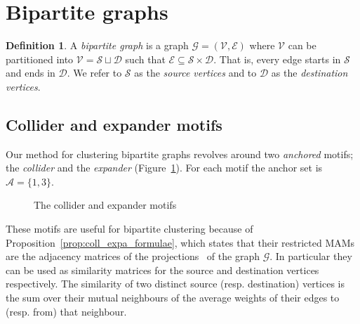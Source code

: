\documentclass[12pt,draft]{ociamthesis}
\theoremstyle{plain}
\theoremstyle{definition}
\newtheorem{definition}{Definition}[chapter]
\theoremstyle{remark}
\newcommand\ca[1]{\mathcal{#1}}
\begin{document}
\section{Bipartite graphs} \label{sec:bipartite_graphs}

\begin{definition}
A \emph{bipartite graph} is a graph $\ca{G}=(\ca{V,E})$ where $\ca{V}$ can be
partitioned into $\ca{V} = \ca{S} \sqcup \ca{D}$ such that $\ca{E} \subseteq
\ca{S} \times \ca{D}$. That is, every edge starts in $\ca{S}$ and ends in
$\ca{D}$. We refer to $\ca{S}$ as the \emph{source vertices} and to $\ca{D}$
as the \emph{destination vertices}.
\end{definition}

\subsection{Collider and expander motifs} \label{sec:coll_expa}

Our method for clustering bipartite graphs revolves around two \emph{anchored}
motifs; the \emph{collider} and the \emph{expander}
(Figure~\ref{fig:expa_coll}). For each motif the anchor set is $\ca{A}=\{ 1,3
\}$.

\begin{figure}[H]
\centering
\caption{The collider and expander motifs}
\label{fig:expa_coll}
\end{figure}

These motifs are useful for bipartite clustering because of
Proposition~\ref{prop:coll_expa_formulae}, which states that their restricted
MAMs are the adjacency matrices of the
projections~\cite{kolaczyk2014statistical} of the graph $\ca{G}$.
In particular they can be used as similarity matrices for the source and
destination vertices respectively.
The similarity of two distinct source (resp. destination) vertices is the sum
over their mutual neighbours of the average weights of their edges to (resp.
from) that neighbour.
\end{document}
